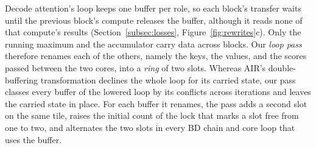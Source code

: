 Decode attention's loop keeps one buffer per role, so each block's transfer waits until the previous block's compute releases the buffer, although it reads none of that compute's results (Section~\ref{subsec:losses}, Figure~\ref{fig:rewrites}c).
Only the running maximum and the accumulator carry data across blocks.
Our \emph{loop pass} therefore renames each of the others, namely the keys, the values, and the scores passed between the two cores, into a \emph{ring} of two slots.
Whereas AIR's double-buffering transformation declines the whole loop for its carried state, our pass classes every buffer of the lowered loop by its conflicts across iterations and leaves the carried state in place.
For each buffer it renames, the pass adds a second slot on the same tile, raises the initial count of the lock that marks a slot free from one to two, and alternates the two slots in every BD chain and core loop that uses the buffer.

